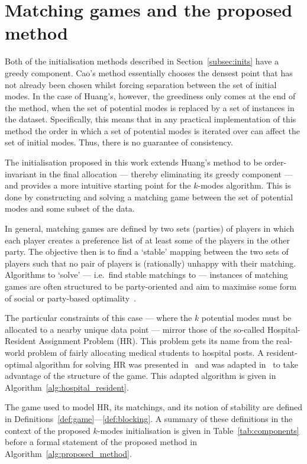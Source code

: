 \section{Matching games and the proposed method}\label{sec:method}

Both of the initialisation methods described in Section~\ref{subsec:inits} have
a greedy component. Cao's method essentially chooses the densest point that has
not already been chosen whilst forcing separation between the set of initial
modes. In the case of Huang's, however, the greediness only comes at the end
of the method, when the set of potential modes is replaced by a set of instances
in the dataset. Specifically, this means that in any practical implementation of
this method the order in which a set of potential modes is iterated over can
affect the set of initial modes. Thus, there is no guarantee of consistency.

The initialisation proposed in this work extends Huang's method to be
order-invariant in the final allocation --- thereby eliminating its greedy
component --- and provides a more intuitive starting point for the \(k\)-modes
algorithm. This is done by constructing and solving a matching game between the
set of potential modes and some subset of the data.

In general, matching games are defined by two sets (parties) of players in which
each player creates a preference list of at least some of the players in the
other party. The objective then is to find a `stable' mapping between the two
sets of players such that no pair of players is (rationally) unhappy with their
matching. Algorithms to `solve' --- i.e.\ find stable matchings to --- instances
of matching games are often structured to be party-oriented and aim to maximise
some form of social or party-based optimality~\cite{%
    Erdil2017,Fuku2006,Gale1962,Iwama2016,Kwanashie2015,Manlove2002%
}.

The particular constraints of this case --- where the \(k\) potential modes must
be allocated to a nearby unique data point --- mirror those of the so-called
Hospital-Resident Assignment Problem (HR). This problem gets its name from the
real-world problem of fairly allocating medical students to hospital posts.  A
resident-optimal algorithm for solving HR was presented in~\cite{Gale1962} and
was adapted in~\cite{Roth1984} to take advantage of the structure of the game.
This adapted algorithm is given in Algorithm~\ref{alg:hospital_resident}.

The game used to model HR, its matchings, and its notion of stability are
defined in Definitions~\ref{def:game}---\ref{def:blocking}. A summary of these
definitions in the context of the proposed \(k\)-modes initialisation is given
in Table~\ref{tab:components} before a formal statement of the proposed method
in Algorithm~\ref{alg:proposed_method}.

